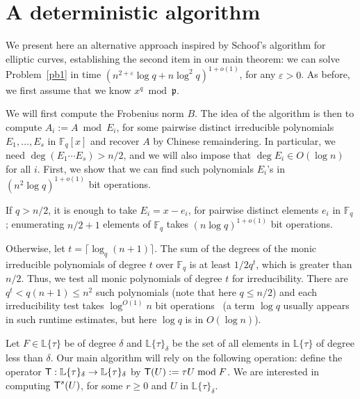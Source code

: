 \documentclass[sigconf]{acmart}
\newcommand{\F}{\mathbb{F}}
\renewcommand{\L}{\mathbb{L}}
\newcommand{\ang}[1]{\{#1\}}
\newcommand{\frakp}{\mathfrak{p}}
\begin{document}

\section{A deterministic algorithm}\label{sec:schoof}

We present here an alternative approach inspired by Schoof's algorithm
for elliptic curves, establishing the second item in our main theorem:
we can solve Problem~\ref{pb1} in time $(n^{2+\varepsilon} \log q + n
\log^2 q)^{1+o(1)}$, for any $\varepsilon > 0$. As before, we first assume 
that we know $x^q \bmod \frakp$.

\smallskip{} We will first compute the Frobenius norm
$B$. The idea of the algorithm is then to compute $A_i:=A \bmod E_i$, for
some pairwise distinct irreducible polynomials $E_1,\dots,E_s$ in
$\F_q[x]$ and recover $A$ by Chinese remaindering.  In particular, we
need $\deg(E_1 \cdots E_s) > n/2$, and we will also impose that $\deg
E_i \in O(\log n)$ for all $i$. First, we show that we can find such
polynomials $E_i$'s in $(n^2 \log q)^{1+o(1)}$ bit operations.

If $q > n/2$, it is enough to take $E_i = x-e_i$, for pairwise
distinct elements $e_i$ in $\F_q$; enumerating $n/2+1$ elements of
$\F_q$ takes $(n \log q)^{1+o(1)}$ bit operations.

Otherwise, let $t= \lceil \log_q (n+1)\rceil$. The sum of the degrees
of the monic irreducible polynomials of degree $t$ over $\F_q$ is at
least $1/2 q^t$, which is greater than $n/2$. Thus, we test all monic
polynomials of degree $t$ for irreducibility. There are $q^t < q(n+1)
\le n^2$ such polynomials (note that here $q \le n/2$) and each
irreducibility test takes $\log^{O(1)} n$ bit
operations~\cite{vonzurGathen1992} (a term $\log q$ usually appears in
such runtime estimates, but here $\log q$ is in $O(\log n)$).

\smallskip{} Let $F \in\L\ang{\tau}$ be of degree
$\delta$ and $\L\ang{\tau}_{\delta}$ be the set of all elements in
$\L\ang{\tau}$ of degree less than $\delta$. Our main algorithm will
rely on the following operation: define the operator $\text{\sf
  T}:\L\ang{\tau}_{\delta} \to \L\ang{\tau}_{\delta}$ by $\text{\sf
  T}(U) := \tau U \bmod F$.  We are interested in computing $\text{\sf
  T}^s(U)$, for some $r \ge 0$ and $U$ in
$\L\ang{\tau}_{\delta}$.
\end{document}
